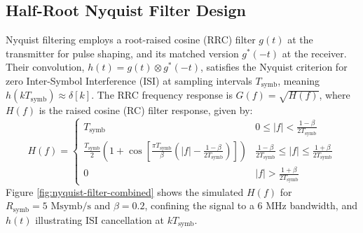 \documentclass[11pt]{article}
\begin{document}
	\subsection{Half-Root Nyquist Filter Design}
	Nyquist filtering employs a root-raised cosine (RRC) filter $g(t)$ at the transmitter for pulse shaping, and its matched version $g^*(-t)$ at the receiver. Their convolution, $h(t) = g(t) \otimes g^*(-t)$, satisfies the Nyquist criterion for zero Inter-Symbol Interference (ISI) at sampling intervals $T_{\text{symb}}$, meaning $h(kT_{\text{symb}}) \approx \delta[k]$. The RRC frequency response is $G(f) = \sqrt{H(f)}$, where $H(f)$ is the raised cosine (RC) filter response, given by:
	\begin{equation}
		H(f) = \begin{cases}
			T_{\text{symb}} & 0 \le |f| < \frac{1-\beta}{2T_{\text{symb}}} \\ 
			\frac{T_{\text{symb}}}{2} \left(1 + \cos\left[\frac{\pi T_{\text{symb}}}{\beta}\left(|f| - \frac{1-\beta}{2T_{\text{symb}}}\right)\right]\right) & \frac{1-\beta}{2T_{\text{symb}}} \le |f| \le \frac{1+\beta}{2T_{\text{symb}}} \\ 
			0 & |f| > \frac{1+\beta}{2T_{\text{symb}}}
		\end{cases}
	\end{equation}
	Figure \ref{fig:nyquist-filter-combined} shows the simulated $H(f)$ for $R_{\text{symb}} = 5 \text{ Msymb/s}$ and $\beta = 0.2$, confining the signal to a 6 MHz bandwidth, and $h(t)$ illustrating ISI cancellation at $kT_{\text{symb}}$.
	
\end{document}
